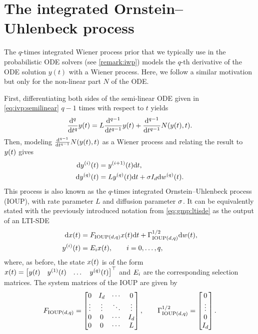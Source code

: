 \documentclass{mimosis}
\begin{document}
\section{The integrated Ornstein--Uhlenbeck process}
\label{sec:orgae09a5c}
The \(q\)-times integrated Wiener process prior that we typically use in the probabilistic ODE solvers (see \cref{remark:iwp}) models the \(q\)-th derivative of the ODE solution \(y(t)\) with a Wiener process.
Here, we follow a similar motivation but only for the non-linear part \(N\) of the ODE.

First, differentiating both sides of the semi-linear ODE
given in \cref{eq:ivp:semilinear}
\(q-1\) times with respect to \(t\) yields
\begin{equation}
  \label{eq:ivp:semilinear:q-1}
  \dv[q]{}{t} y(t) = L \dv[q-1]{}{t} y(t) + \dv[q-1]{}{t} N(y(t), t).
\end{equation}
Then, modeling
\(\dv[q-1]{}{t} N(y(t), t)\)
as a Wiener process and relating the result to \(y(t)\)
gives
\begin{subequations}
  \label{eq:ioup_sde_separate}
  \begin{align}
    \dd y^{(i)} (t) &= y^{(i+1)}(t) \dd t, \\
    \dd y^{(q)} (t) &= L y^{(q)}(t) \dd t + \sigma I_d \dd w^{(q)}(t).
                       \label{eq:ioup_noise_sde}
  \end{align}
\end{subequations}
This process is also known as the \(q\)-times integrated Ornstein--Uhlenbeck process (IOUP), with rate parameter \(L\) and diffusion parameter \(\sigma\).
It can be equivalently stated with the previously introduced notation from
\cref{eq:gmp:ltisde}
as the output of an LTI-SDE
\begin{subequations}
\begin{align}
  \dd x(t) &= F_{\operatorname{IOUP}(d,q)} x(t) \dd t + \Gamma^{1/2}_{\operatorname{IOUP}(d,q)} \dd w(t), \\
  y^{(i)}(t) &= E_{i} x(t), \qquad i = 0, \dots, q,
\end{align}
\end{subequations}
where, as before, the state \(x(t)\) is of the form
\(\st(t) = \mqty[\val(t) & \val^{(1)}(t) & \dots & \val^{(q)}(t) ]^\T\)
and \(E_{i}\) are the corresponding selection matrices.
The system matrices of the IOUP are given by
\begin{equation}
  \label{eq:ioup-matrices}
  F_{\operatorname{IOUP}(d,q)} =
  \begin{bmatrix}
    0 & I_d & \cdots & 0 \\
    \vdots & \vdots & \ddots & \vdots \\
    0 & 0 & \cdots & I_d \\
    0 & 0 & \cdots & L
  \end{bmatrix},
\qquad
  \Gamma^{1/2}_{\operatorname{IOUP}(d,q)} = \begin{bmatrix} 0 \\ \vdots \\ 0 \\ I_d \end{bmatrix}.
\end{equation}
\end{document}
